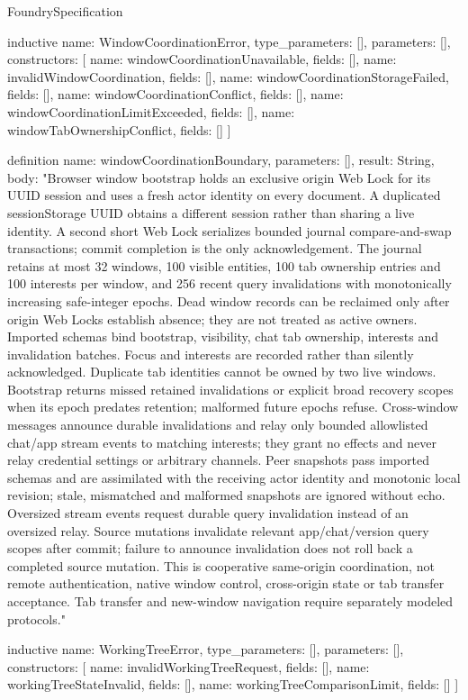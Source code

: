 \begin{lexlean}{FoundrySpecification}
\begin{semanticmodule}
inductive{
  name: WindowCoordinationError,
  type_parameters: [],
  parameters: [],
  constructors: [
    {name: windowCoordinationUnavailable, fields: []},
    {name: invalidWindowCoordination, fields: []},
    {name: windowCoordinationStorageFailed, fields: []},
    {name: windowCoordinationConflict, fields: []},
    {name: windowCoordinationLimitExceeded, fields: []},
    {name: windowTabOwnershipConflict, fields: []}
  ]
}

definition{
  name: windowCoordinationBoundary,
  parameters: [],
  result: String,
  body: "Browser window bootstrap holds an exclusive origin Web Lock for its UUID session and uses a fresh actor identity on every document. A duplicated sessionStorage UUID obtains a different session rather than sharing a live identity. A second short Web Lock serializes bounded journal compare-and-swap transactions; commit completion is the only acknowledgement. The journal retains at most 32 windows, 100 visible entities, 100 tab ownership entries and 100 interests per window, and 256 recent query invalidations with monotonically increasing safe-integer epochs. Dead window records can be reclaimed only after origin Web Locks establish absence; they are not treated as active owners. Imported schemas bind bootstrap, visibility, chat tab ownership, interests and invalidation batches. Focus and interests are recorded rather than silently acknowledged. Duplicate tab identities cannot be owned by two live windows. Bootstrap returns missed retained invalidations or explicit broad recovery scopes when its epoch predates retention; malformed future epochs refuse. Cross-window messages announce durable invalidations and relay only bounded allowlisted chat/app stream events to matching interests; they grant no effects and never relay credential settings or arbitrary channels. Peer snapshots pass imported schemas and are assimilated with the receiving actor identity and monotonic local revision; stale, mismatched and malformed snapshots are ignored without echo. Oversized stream events request durable query invalidation instead of an oversized relay. Source mutations invalidate relevant app/chat/version query scopes after commit; failure to announce invalidation does not roll back a completed source mutation. This is cooperative same-origin coordination, not remote authentication, native window control, cross-origin state or tab transfer acceptance. Tab transfer and new-window navigation require separately modeled protocols."
}

inductive{
  name: WorkingTreeError,
  type_parameters: [],
  parameters: [],
  constructors: [
    {name: invalidWorkingTreeRequest, fields: []},
    {name: workingTreeStateInvalid, fields: []},
    {name: workingTreeComparisonLimit, fields: []}
  ]
}


\end{semanticmodule}
\end{lexlean}
